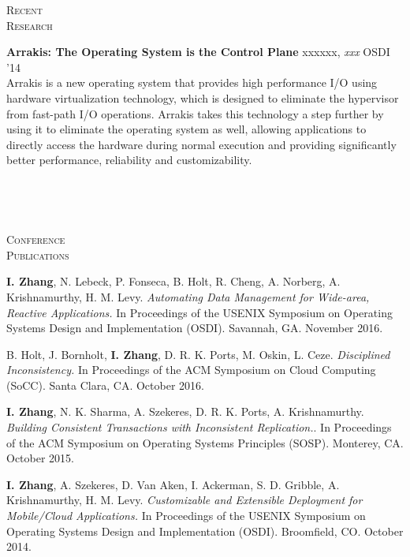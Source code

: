 \documentclass[10pt,minionpro]{report}
\newlength{\sectiongap}
\newlength{\entrygap}
\newlength{\sectioncolwidth}
\newlength{\colgap}
\newlength{\stuffwidth}
\def\ifEqString#1#2{\def\testa{#1}\def\testb{#2}%
  \ifx\testa\testb}
\newenvironment{rtable}{
  \begin{minipage}{\textwidth}
  }{
  \end{minipage}
}
\newenvironment{rentry}[3][xxx]{
  \begin{minipage}[t]{\hsize}
    \textbf{#2}\ifEqString{#1}{xxx}\relax\else, \textit{#1}\fi
    \hspace{\stretch{1}} #3 \\
  }{
    \removelastskip
  \end{minipage}
  \\[\entrygap]  %
}
\newenvironment{rsection}[1]{
  \begin{minipage}[t]{\sectioncolwidth}
    \textsc{#1}
  \end{minipage}
  \hspace{\colgap}
  \begin{minipage}[t]{\stuffwidth}
  }{
    \removelastskip
  \end{minipage}
  \\[\sectiongap]
}
\begin{document}
\begin{rtable}
\begin{rsection}{Recent\\Research}
    \begin{rentry}{Arrakis: The Operating System is the Control
        Plane}{OSDI '14}
      Arrakis is a new operating system that provides high performance
      I/O using hardware virtualization technology, which is designed
      to eliminate the hypervisor from fast-path I/O
      operations. Arrakis takes this technology a step further by
      using it to eliminate the operating system as well, allowing
      applications to directly access the hardware during normal
      execution and providing significantly better performance,
      reliability and customizability.
    \end{rentry}
  \end{rsection}    
\end{rtable}

\begin{rtable}
 \begin{rsection}{Conference\\Publications}
   \textbf{I. Zhang}, N. Lebeck, P. Fonseca, B. Holt, R. Cheng,
   A. Norberg, A. Krishnamurthy, H.  M. Levy. \textit{Automating Data
     Management for Wide-area, Reactive Applications.}  In Proceedings
   of the USENIX Symposium on Operating Systems Design and
   Implementation (OSDI). Savannah, GA. November
   2016.\\\vspace{-0.5em}

   B. Holt, J. Bornholt, \textbf{I. Zhang}, D. R. K. Ports, M.  Oskin,
   L. Ceze. \textit{Disciplined Inconsistency.}  In Proceedings of the
   ACM Symposium on Cloud Computing (SoCC). Santa Clara, CA. October
   2016.\\\vspace{-0.5em}

   \textbf{I. Zhang}, N. K. Sharma, A. Szekeres, D. R. K. Ports,
   A. Krishnamurthy. \textit{Building Consistent Transactions with
     Inconsistent Replication.}.  In Proceedings of the ACM Symposium
   on Operating Systems Principles (SOSP). Monterey, CA. October
   2015.\\\vspace{-0.5em}

   \textbf{I. Zhang}, A. Szekeres, D. Van Aken, I. Ackerman,
   S. D. Gribble, A. Krishnamurthy, H. M. Levy. \textit{Customizable
     and Extensible Deployment for Mobile/Cloud Applications.}  In
   Proceedings of the USENIX Symposium on Operating Systems Design and
   Implementation (OSDI). Broomfield, CO. October 2014.\\
   \vspace{-0.5em}


\end{rsection}
\end{rtable}
\end{document}
